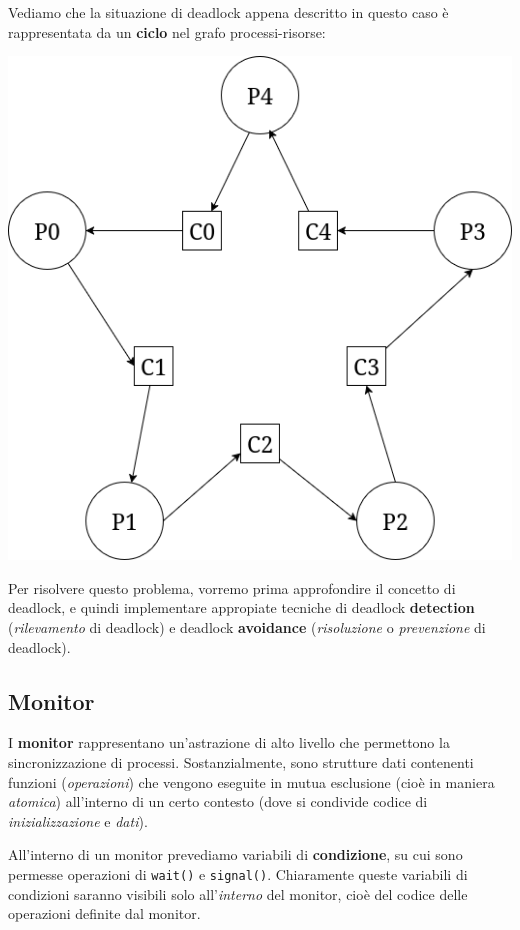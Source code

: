\documentclass[a4paper,11pt]{article}
\begin{document}
\begin{enumerate}
Vediamo che la situazione di deadlock appena descritto in questo caso è rappresentata da un \textbf{ciclo} nel grafo processi-risorse:
\begin{center}
	\includegraphics[scale=0.35]{../figures/filosofi_lock.png}
\end{center}

Per risolvere questo problema, vorremo prima approfondire il concetto di deadlock, e quindi implementare appropiate tecniche di deadlock \textbf{detection} (\textit{rilevamento} di deadlock) e deadlock \textbf{avoidance} (\textit{risoluzione} o \textit{prevenzione} di deadlock).
\end{enumerate}

\subsection{Monitor}
I \textbf{monitor} rappresentano un'astrazione di alto livello che permettono la sincronizzazione di processi.
Sostanzialmente, sono strutture dati contenenti funzioni (\textit{operazioni}) che vengono eseguite in mutua esclusione (cioè in maniera \textit{atomica}) all'interno di un certo contesto (dove si condivide codice di \textit{inizializzazione} e \textit{dati}).

All'interno di un monitor prevediamo variabili di \textbf{condizione}, su cui sono permesse operazioni di \lstinline|wait()| e \lstinline|signal()|.
Chiaramente queste variabili di condizioni saranno visibili solo all'\textit{interno} del monitor, cioè del codice delle operazioni definite dal monitor. 
\end{document}

